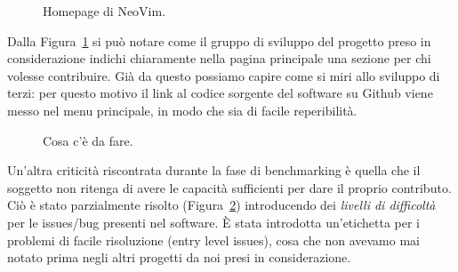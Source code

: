 \documentclass[12pt]{article} %
\begin{document}
\begin{figure}[H]
\caption{Homepage di NeoVim.}
\label{fig:buonesempio1}
\end{figure}

Dalla Figura~\ref{fig:buonesempio1} si pu\`o notare come il gruppo di sviluppo del progetto preso in considerazione indichi chiaramente nella pagina principale una sezione per chi volesse contribuire. Gi\`a da questo possiamo capire come si miri allo sviluppo di terzi: per questo motivo il link al codice sorgente del software su Github viene messo nel menu principale, in modo che sia di facile reperibilit\`a.

\begin{figure}[H]
\caption{Cosa c'\`e da fare.}
\label{fig:buonesempio2}
\end{figure}

Un'altra criticit\`a riscontrata durante la fase di benchmarking \`e quella che il soggetto non ritenga di avere le capacit\`a sufficienti per dare il proprio contributo.\\
Ci\`o \`e stato parzialmente risolto (Figura~\ref{fig:buonesempio2}) introducendo dei \emph{livelli di difficolt\`a} per le issues/bug presenti nel software. \`E stata introdotta un'etichetta per i problemi di facile risoluzione (entry level issues), cosa che non avevamo mai notato prima negli altri progetti da noi presi in considerazione.
\end{document}
